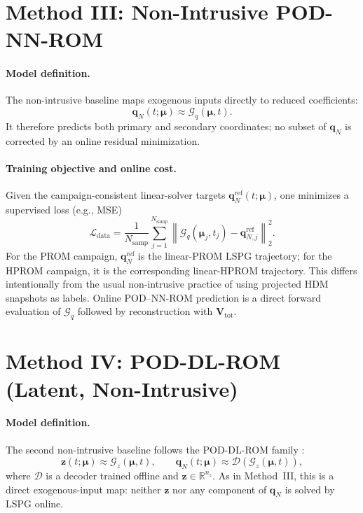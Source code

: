 \documentclass[11pt]{article}
\begin{document}
\section{Method III: Non-Intrusive POD-NN-ROM}
\label{sec:method-datadriven}

\paragraph{Model definition.}
The non-intrusive baseline maps exogenous inputs directly to reduced coefficients:
\begin{equation}
\mathbf q_N(t;\bm\mu)\approx\mathcal G_q(\bm\mu,t).
\label{eq:data-driven-map-q}
\end{equation}
It therefore predicts both primary and secondary coordinates; no subset of
$\mathbf q_N$ is corrected by an online residual minimization.

\paragraph{Training objective and online cost.}
Given the campaign-consistent linear-solver targets $\mathbf q_N^{\mathrm{ref}}(t;\bm\mu)$, one minimizes a supervised loss (e.g., MSE)
\begin{equation}
\mathcal L_{\mathrm{data}}
=\frac{1}{N_{\mathrm{samp}}}\sum_{j=1}^{N_{\mathrm{samp}}}
\left\|\mathcal G_q(\bm\mu_j,t_j)-\mathbf q_{N,j}^{\mathrm{ref}}\right\|_2^2.
\end{equation}
For the PROM campaign, $\mathbf q_N^{\mathrm{ref}}$ is the linear-PROM LSPG
trajectory; for the HPROM campaign, it is the corresponding linear-HPROM
trajectory.  This differs intentionally from the usual non-intrusive practice
of using projected HDM snapshots as labels.  Online POD--NN-ROM prediction is
a direct forward evaluation of $\mathcal G_q$ followed by reconstruction with
$\mathbf V_{\mathrm{tot}}$.

\section{Method IV: POD-DL-ROM (Latent, Non-Intrusive)}
\label{sec:method-datadriven-latent}

\paragraph{Model definition.}
The second non-intrusive baseline follows the POD-DL-ROM family \cite{fresca2022pod}:
\begin{equation}
\mathbf z(t;\bm\mu)\approx\mathcal G_z(\bm\mu,t),\qquad
\mathbf q_N(t;\bm\mu)\approx\mathcal D\!\left(\mathcal G_z(\bm\mu,t)\right),
\label{eq:data-driven-map-z}
\end{equation}
where $\mathcal D$ is a decoder trained offline and $\mathbf z\in\mathbb R^{n_z}$.
As in Method~III, this is a direct exogenous-input map: neither $\mathbf z$
nor any component of $\mathbf q_N$ is solved by LSPG online.
\end{document}
